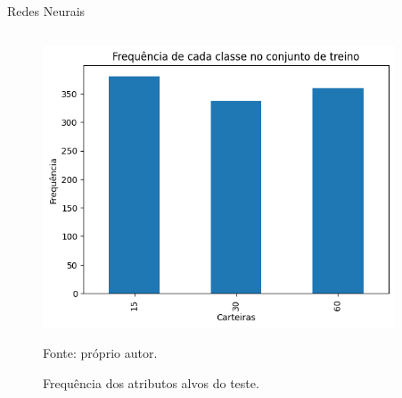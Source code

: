     \begin{frame}{Redes Neurais}

        \begin{columns}
            \begin{column}{0.5\textwidth}

                \begin{figure}[htbp]
                    \centering
                    \caption{Frequência dos atributos alvos do teste.}
                    \label{fig:freq}
                    \includegraphics[width=0.98\textwidth]{./images/freq.png}
                    \par \footnotesize Fonte: próprio autor.
                \end{figure}

            \end{column}

            \begin{column}{0.5\textwidth}


\end{column}
\end{columns}
\end{frame}
